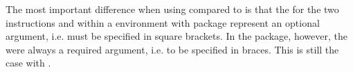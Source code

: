 \begin{Declaration}
\end{Declaration}
The most important difference when using  compared to
 is that the  for the two instructions
 and  within a 
environment with package  represent an optional argument,
i.e. must be specified in square brackets. In the  package,
however, the  were always a required argument, i.e. to be
specified in braces. This is still the case with .%
%
\EndIndexGroup
%
\EndIndexGroup

\endinput

